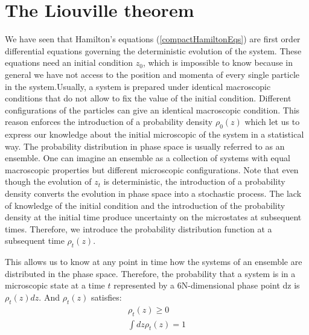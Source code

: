 \documentclass[a4paper,openright,12pt]{book}
\begin{document}
\section{The Liouville theorem}
We have seen that Hamilton's equations (\ref{compactHamiltonEqs}) are first order differential equations governing the deterministic evolution of the system. 
These equations need an initial condition $z_0$, which is impossible to know because in general we have not access to the position and momenta of every single particle in the system.Usually, a system is prepared under identical macroscopic conditions that do not allow to fix the value of the initial condition. 
Different configurations of the particles can give an identical macroscopic condition. 
This reason enforces the introduction of a probability density $\rho_0(z)$ which let us to express our knowledge about the initial microscopic of the system in a statistical way. The probability distribution in phase space is usually referred to as an ensemble. One can imagine an ensemble as a collection of systems with equal macroscopic properties but different microscopic configurations.
Note that even though the evolution of $z_t$ is deterministic, the introduction of a probability density converts the evolution in phase space into a stochastic process.
The lack of knowledge of the initial condition and the introduction of the probability density at the initial time produce uncertainty on the microstates at subsequent times. Therefore, we introduce the probability distribution function at a subsequent time $\rho_t(z)$.


This allows us to know at any point in time how the systems of an ensemble are distributed in the phase space.
Therefore, the probability that a system is in a microscopic state at a time $t$ represented by a 6N-dimensional phase point dz is $\rho_t(z)dz$. And $\rho_t(z)$ satisfies:
\begin{align}
    \rho_t(z) \geq 0  \nonumber \\
    \int dz\rho_t(z) = 1
\end{align}
\end{document}

